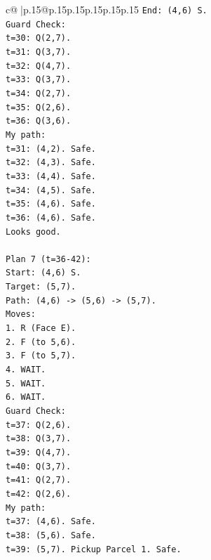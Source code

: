 \documentclass{article}
\begin{document}
{\begin{supertabular}{c@{$\;$}|p{.15\linewidth}@{}p{.15\linewidth}p{.15\linewidth}p{.15\linewidth}p{.15\linewidth}p{.15\linewidth}}
{{{\texttt{End: (4,6) S.} \\
\texttt{Guard Check:} \\
\texttt{t=30: Q(2,7).} \\
\texttt{t=31: Q(3,7).} \\
\texttt{t=32: Q(4,7).} \\
\texttt{t=33: Q(3,7).} \\
\texttt{t=34: Q(2,7).} \\
\texttt{t=35: Q(2,6).} \\
\texttt{t=36: Q(3,6).} \\
\texttt{My path:} \\
\texttt{t=31: (4,2). Safe.} \\
\texttt{t=32: (4,3). Safe.} \\
\texttt{t=33: (4,4). Safe.} \\
\texttt{t=34: (4,5). Safe.} \\
\texttt{t=35: (4,6). Safe.} \\
\texttt{t=36: (4,6). Safe.} \\
\texttt{Looks good.} \\
\\ 
\texttt{Plan 7 (t=36{-}42):} \\
\texttt{Start: (4,6) S.} \\
\texttt{Target: (5,7).} \\
\texttt{Path: (4,6) {-}> (5,6) {-}> (5,7).} \\
\texttt{Moves:} \\
\texttt{1. R (Face E).} \\
\texttt{2. F (to 5,6).} \\
\texttt{3. F (to 5,7).} \\
\texttt{4. WAIT.} \\
\texttt{5. WAIT.} \\
\texttt{6. WAIT.} \\
\texttt{Guard Check:} \\
\texttt{t=37: Q(2,6).} \\
\texttt{t=38: Q(3,7).} \\
\texttt{t=39: Q(4,7).} \\
\texttt{t=40: Q(3,7).} \\
\texttt{t=41: Q(2,7).} \\
\texttt{t=42: Q(2,6).} \\
\texttt{My path:} \\
\texttt{t=37: (4,6). Safe.} \\
\texttt{t=38: (5,6). Safe.} \\
\texttt{t=39: (5,7). Pickup Parcel 1. Safe.} \\
}}}
\end{supertabular}}
\end{document}
